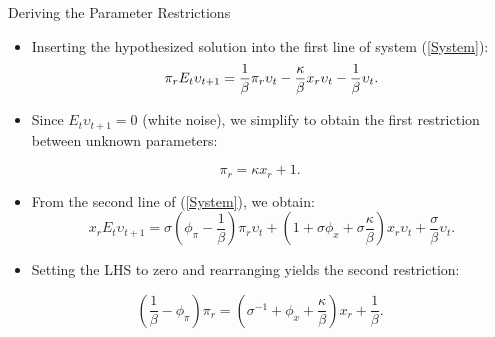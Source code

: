 \documentclass[11pt,aspectratio=169]{beamer}
\begin{document}
\begin{frame}{Deriving the Parameter Restrictions}
\small

\begin{itemize}
    \item Inserting the hypothesized solution into the first line of system (\ref{System}):
    \begin{equation*}
    \pi _{r}E_{t}\upsilon _{t+1}=\frac{1}{\beta }\pi _{r}\upsilon _{t}-\frac{%
    \kappa }{\beta }x_{r}\upsilon _{t}-\frac{1}{\beta }\upsilon _{t}.
    \end{equation*}
    \item Since $E_{t}\upsilon _{t+1}=0$ (white noise), we simplify to obtain the first restriction between unknown parameters:
\end{itemize}
\begin{equation}
\pi _{r}=\kappa x_{r}+1. \label{sol1}
\end{equation}

\begin{itemize}
    \item From the second line of (\ref{System}), we obtain:
    \begin{equation*}
    x_{r}E_{t}\upsilon _{t+1}=\sigma \left( \phi _{\pi }-\frac{1}{\beta }\right)
    \pi _{r}\upsilon _{t}+\left( 1+\sigma \phi _{x}+\sigma \frac{\kappa }{\beta }%
    \right) x_{r}\upsilon _{t}+\frac{\sigma }{\beta }\upsilon _{t}.
    \end{equation*}
    \item Setting the LHS to zero and rearranging yields the second restriction:
\end{itemize}
\begin{equation}
\left( \frac{1}{\beta }-\phi _{\pi }\right) \pi _{r}=\left( \sigma
^{-1}+\phi _{x}+\frac{\kappa }{\beta }\right) x_{r}+\frac{1}{\beta }.
\label{sol2}
\end{equation}

\end{frame}
\end{document}

